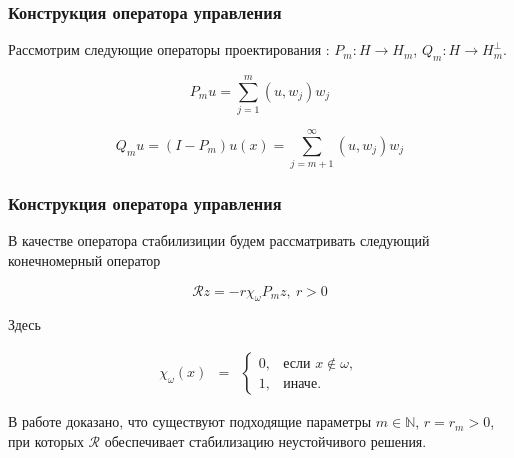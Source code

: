 \documentclass{beamer}
\newcommand{\operator}[1]{\mathcal{R}{#1}}
\begin{document}
\begin{frame}
    \frametitle{Конструкция оператора управления}

    Рассмотрим следующие операторы проектирования : 
    $P_m : H \rightarrow H_m$, $Q_m : H \rightarrow H_m^{\perp}$.

    \begin{block}{}
        \begin{equation}
            P_m u = \sum \limits_{j=1}^{m} {(u, w_j) w_j}
        \end{equation}

        \begin{equation}
            Q_m u = (I - P_m)u(x) = \sum \limits_{j=m + 1}^{\infty} {(u, w_j) w_j}
        \end{equation}
    \end{block}

\end{frame}

\begin{frame}
    \frametitle{Конструкция оператора управления}

    В качестве оператора стабилизиции будем рассматривать следующий конечномерный оператор

    \begin{block}{}
        \begin{equation}
            \operator{z} = -r\chi_{\omega}P_mz, \ r > 0
        \end{equation}
    \end{block}
    Здесь 
    \begin{block}{}
        \begin{equation}
            \begin{matrix}
                \chi_{\omega}(x) & =
                & \left\{
                \begin{matrix}
                    0, & \mbox{если } x \notin \omega, \\
                    1, & \mbox{иначе. }
                \end{matrix} \right.
            \end{matrix}
        \end{equation}
    \end{block}

    В работе доказано, что существуют подходящие параметры 
    $m \in \mathbb{N}$, $r = r_m > 0$, при которых $\operator{}$ обеспечивает 
    стабилизацию неустойчивого решения.

\end{frame}
\end{document}
